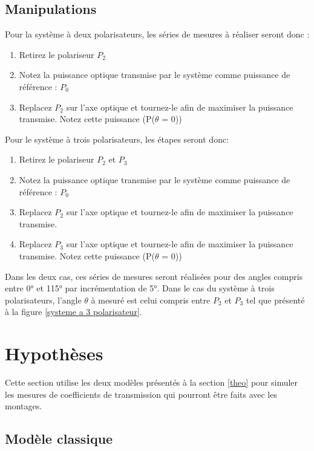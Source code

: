 \documentclass[11pt,letterpaper]{article}
\begin{document}
\subsection{Manipulations}

Pour la système à deux polarisateurs, les séries de mesures à réaliser seront donc :

\begin{enumerate}
    \item Retirez le polariseur $P_2$
    \item Notez la puissance optique transmise par le système comme puissance de référence : $P_0$
    \item Replacez $P_2$ sur l’axe optique et tournez-le afin de maximiser la puissance transmise. Notez cette puissance (P($\theta$ = 0))
\end{enumerate}

Pour le système à trois polarisateurs, les étapes seront donc: 

\begin{enumerate}
    \item Retirez le polariseur $P_2$ et $P_3$
    \item Notez la puissance optique transmise par le système comme puissance de référence : $P_0$
    \item Replacez $P_2$ sur l’axe optique et tournez-le afin de maximiser la puissance transmise.
    \item Replacez $P_3$ sur l’axe optique et tournez-le afin de maximiser la puissance transmise. Notez cette puissance (P($\theta$ = 0))
\end{enumerate}

Dans les deux cas, ces séries de mesures seront réalisées pour des angles compris entre 0° et 115° par incrémentation de 5°. Dans le cas du système à trois polarisateurs, l'angle $\theta$ à mesuré est celui compris entre $P_2$ et $P_3$ tel que présenté à la figure \ref{systeme a 3 polarisateur}.



\section{Hypothèses}

Cette section utilise les deux modèles présentés à la section \ref{theo} pour simuler les mesures de
coefficients de transmission qui pourront être faits avec les montages.

\subsection{Modèle classique}
\end{document}
